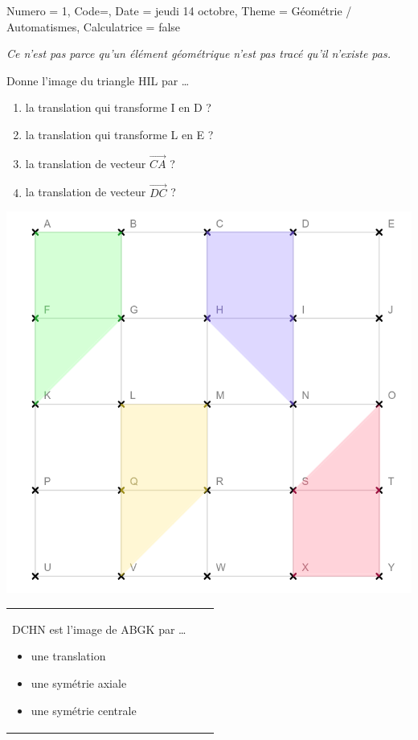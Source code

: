 \documentclass[11pt]{article}
\newcommand{\ligne}{{\color{gray!60}\hrulefill}}
\begin{document}
\begin{Maquette}[IE]{
        Numero = 1, Code={}, Date = jeudi 14 octobre, Theme = Géométrie / Automatismes, Calculatrice = false
    }
\begin{exercice}
\begin{multicols}{2}
\begin{center}
                {\small \emph{Ce n’est pas parce qu’un élément géométrique n’est pas tracé qu’il n’existe pas.}}
            \end{center}
            \columnbreak
            Donne l’image du triangle HIL par …
            \begin{enumerate}[itemsep=5pt]
                \item la translation qui transforme I en D ? \ligne
                \item la translation qui transforme L en E ? \ligne
                \item la translation de vecteur $\overrightarrow{CA}$ ? \ligne
                \item la translation de vecteur $\overrightarrow{DC}$ ? \ligne
            \end{enumerate}
        \end{multicols}
    \end{exercice}

    \newpage

    \begin{exercice}
        \begin{center}
            \includegraphics[width=.65\linewidth]{Images/Évaluation 2 - Quadrillage.png}
        \end{center}
        {\small
        \begin{tabularx}{\textwidth}{X|X|X}
            DCHN est l’image de ABGK par …

            \begin{itemize}[label=$\square$, itemsep=10pt, topsep=10pt]
                \item une translation
                \item une symétrie axiale
                \item une symétrie centrale
            \end{itemize}


\end{tabularx}}
\end{exercice}
\end{Maquette}
\end{document}
